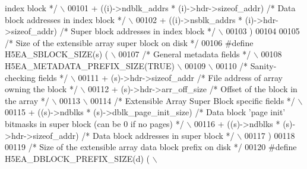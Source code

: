\begin{DoxyCode}
{       index block  */}\textcolor{preprocessor}{ \(\backslash\)}
00101 \textcolor{preprocessor}{    + ((i)->ndblk\_addrs * (i)->hdr->sizeof\_addr) }\textcolor{comment}{/* Data block addresses in index block  */}\textcolor{preprocessor}{ \(\backslash\)}
00102 \textcolor{preprocessor}{    + ((i)->nsblk\_addrs * (i)->hdr->sizeof\_addr) }\textcolor{comment}{/* Super block addresses in index block  */}\textcolor{preprocessor}{ \(\backslash\)}
00103 \textcolor{preprocessor}{    )}
00104 
00105 \textcolor{comment}{/* Size of the extensible array super block on disk */}
00106 \textcolor{preprocessor}{#define H5EA\_SBLOCK\_SIZE(s)     (                                             \(\backslash\)}
00107 \textcolor{preprocessor}{    }\textcolor{comment}{/* General metadata fields */}\textcolor{preprocessor}{                                             \(\backslash\)}
00108 \textcolor{preprocessor}{    H5EA\_METADATA\_PREFIX\_SIZE(TRUE)                                           \(\backslash\)}
00109 \textcolor{preprocessor}{                                                                              \(\backslash\)}
00110 \textcolor{preprocessor}{    }\textcolor{comment}{/* Sanity-checking fields */}\textcolor{preprocessor}{                                              \(\backslash\)}
00111 \textcolor{preprocessor}{    + (s)->hdr->sizeof\_addr          }\textcolor{comment}{/* File address of array owning the block */}\textcolor{preprocessor}{ \(\backslash\)}
00112 \textcolor{preprocessor}{    + (s)->hdr->arr\_off\_size         }\textcolor{comment}{/* Offset of the block in the array */}\textcolor{preprocessor}{   \(\backslash\)}
00113 \textcolor{preprocessor}{                                                                              \(\backslash\)}
00114 \textcolor{preprocessor}{    }\textcolor{comment}{/* Extensible Array Super Block specific fields */}\textcolor{preprocessor}{                        \(\backslash\)}
00115 \textcolor{preprocessor}{    + ((s)->ndblks * (s)->dblk\_page\_init\_size) }\textcolor{comment}{/* Data block 'page init' bitmasks in super block (can be 0
       if no pages) */}\textcolor{preprocessor}{ \(\backslash\)}
00116 \textcolor{preprocessor}{    + ((s)->ndblks * (s)->hdr->sizeof\_addr) }\textcolor{comment}{/* Data block addresses in super block  */}\textcolor{preprocessor}{ \(\backslash\)}
00117 \textcolor{preprocessor}{    )}
00118 
00119 \textcolor{comment}{/* Size of the extensible array data block prefix on disk */}
00120 \textcolor{preprocessor}{#define H5EA\_DBLOCK\_PREFIX\_SIZE(d)  (                                         \(\backslash\)}

\end{DoxyCode}
